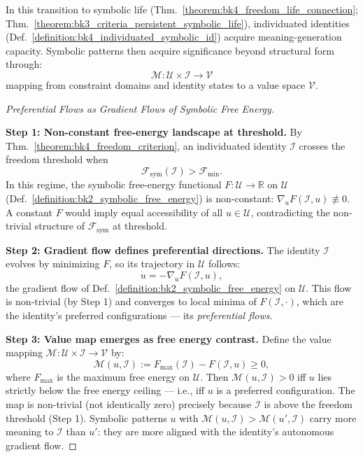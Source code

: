 \begin{corollary} \label{corollary:bk4_emergence_of_meaning}
\par
In this transition to symbolic life
(Thm.~\ref{theorem:bk4_freedom_life_connection};
Thm.~\ref{theorem:bk3_criteria_persistent_symbolic_life}),
individuated identities (Def.~\ref{definition:bk4_individuated_symbolic_id})
acquire meaning-generation capacity.
Symbolic patterns then acquire significance beyond structural form through:
\begin{equation}
    \mathcal{M}: \mathcal{U} \times \mathcal{I} \to \mathcal{V}
\end{equation}
mapping from constraint domains and identity states to a value space $\mathcal{V}$.
\end{corollary}
\begin{proof}[Preferential Flows as Gradient Flows of Symbolic Free Energy]
\label{proof:bk4_sketch_preferential_flows}
\leavevmode

\textbf{Step 1: Non-constant free-energy landscape at threshold.}
By Thm.~\ref{theorem:bk4_freedom_criterion}, an individuated identity $\mathcal{I}$
crosses the freedom threshold when
\[
\mathcal{F}_{\text{sym}}(\mathcal{I}) > \mathcal{F}_{\min}.
\]
In this regime, the symbolic free-energy functional
$F: \mathcal{U} \to \mathbb{R}$ on $\mathcal{U}$
(Def.~\ref{definition:bk2_symbolic_free_energy}) is non-constant:
$\nabla_u F(\mathcal{I}, u) \not\equiv 0$. A constant $F$ would imply equal
accessibility of all $u \in \mathcal{U}$, contradicting the non-trivial
structure of $\mathcal{F}_{\text{sym}}$ at threshold.

\textbf{Step 2: Gradient flow defines preferential directions.} The identity $\mathcal{I}$ evolves by minimizing $F$, so its trajectory in $\mathcal{U}$ follows:
\[
\dot u = -\nabla_u F(\mathcal{I}, u),
\]
the gradient flow of Def.~\ref{definition:bk2_symbolic_free_energy} on $\mathcal{U}$. This flow is non-trivial (by Step 1) and converges to local minima of $F(\mathcal{I}, \cdot)$, which are the identity's preferred configurations — its \emph{preferential flows}.

\textbf{Step 3: Value map emerges as free energy contrast.} Define the value mapping $\mathcal{M}: \mathcal{U} \times \mathcal{I} \to \mathcal{V}$ by:
\[
\mathcal{M}(u, \mathcal{I}) := F_{\max}(\mathcal{I}) - F(\mathcal{I}, u) \geq 0,
\]
where $F_{\max}$ is the maximum free energy on $\mathcal{U}$. Then $\mathcal{M}(u, \mathcal{I}) > 0$ iff $u$ lies strictly below the free energy ceiling — i.e., iff $u$ is a preferred configuration. The map is non-trivial (not identically zero) precisely because $\mathcal{I}$ is above the freedom threshold (Step 1). Symbolic patterns $u$ with $\mathcal{M}(u,\mathcal{I}) > \mathcal{M}(u', \mathcal{I})$ carry more meaning to $\mathcal{I}$ than $u'$: they are more aligned with the identity's autonomous gradient flow.
\end{proof}
